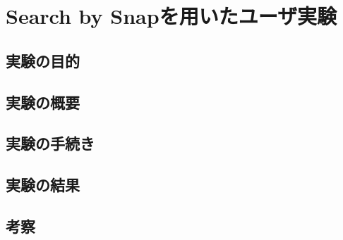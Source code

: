 \chapter{Search by Snapを用いたユーザ実験}

\section{実験の目的}

\section{実験の概要}

\section{実験の手続き}

\section{実験の結果}

\section{考察}